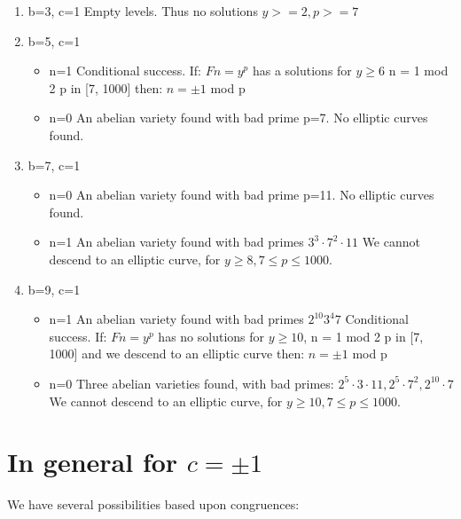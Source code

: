 \documentclass[12pt]{article}
\begin{document}
\begin{enumerate}
\item{b=3, c=1}
  Empty levels. Thus no solutions $y >= 2, p >= 7$
    
\item{b=5, c=1} 
\begin{itemize} 
  \item{n=1}
    Conditional success. If:
      $Fn = y^p$ has a solutions for $y \geq 6$ n = 1 mod 2 p in [7, 1000]
    then:
      $n = \pm 1$ mod p
  \item{n=0}
    An abelian variety found with bad prime p=7.
    No elliptic curves found.
\end{itemize}  
\item{b=7, c=1}
\begin{itemize}
  \item{n=0}
    An abelian variety found with bad prime p=11.
    No elliptic curves found.
  \item{n=1}
    An abelian variety found with bad primes $3^3 \cdot 7^2 \cdot 11$
    We cannot descend to an elliptic curve,
      for $y \geq 8, 7 \leq p \leq 1000$.
\end{itemize}
\item{b=9, c=1}
\begin{itemize}
  
  \item{n=1}
    An abelian variety found with bad primes $2^{10} 3^4 7$
    Conditional success. If:
      $Fn = y^p$ has no solutions for $y \geq 10$, n = 1 mod 2 p in [7, 1000]
      and
      we descend to an elliptic curve
    then:
      $n = \pm 1$ mod p
  \item{n=0}
    Three abelian varieties found, with bad primes:	
      $2^5 \cdot 3 \cdot 11, 2^5 \cdot 7^2, 2^{10} \cdot 7$
    We cannot descend to an elliptic curve,
      for $y \geq 10, 7 \leq p \leq 1000$.

\end{itemize}
\end{enumerate}

\section{In general for $c = \pm 1$}

We have several possibilities based upon congruences:
\end{document}
